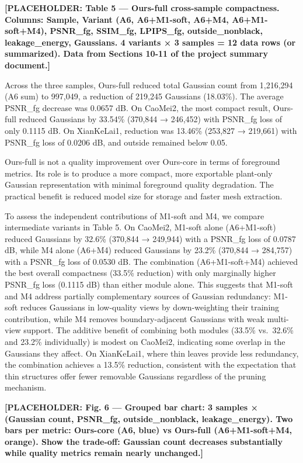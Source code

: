 \documentclass[11pt,a4paper]{article}
\begin{document}
\textbf{{[}PLACEHOLDER: Table 5 --- Ours-full cross-sample compactness.
Columns: Sample, Variant (A6, A6+M1-soft, A6+M4, A6+M1-soft+M4),
PSNR\_fg, SSIM\_fg, LPIPS\_fg, outside\_nonblack, leakage\_energy,
Gaussians. 4 variants × 3 samples = 12 data rows (or summarized). Data
from Sections 10-11 of the project summary document.{]}}

Across the three samples, Ours-full reduced total Gaussian count from
1,216,294 (A6 sum) to 997,049, a reduction of 219,245 Gaussians
(18.03\%). The average PSNR\_fg decrease was 0.0657 dB. On CaoMei2, the
most compact result, Ours-full reduced Gaussians by 33.54\% (370,844 →
246,452) with PSNR\_fg loss of only 0.1115 dB. On XianKeLai1, reduction
was 13.46\% (253,827 → 219,661) with PSNR\_fg loss of 0.0206 dB, and
outside remained below 0.05.

Ours-full is not a quality improvement over Ours-core in terms of
foreground metrics. Its role is to produce a more compact, more
exportable plant-only Gaussian representation with minimal foreground
quality degradation. The practical benefit is reduced model size for
storage and faster mesh extraction.

To assess the independent contributions of M1-soft and M4, we compare
intermediate variants in Table 5. On CaoMei2, M1-soft alone (A6+M1-soft)
reduced Gaussians by 32.6\% (370,844 → 249,944) with a PSNR\_fg loss of
0.0787 dB, while M4 alone (A6+M4) reduced Gaussians by 23.2\% (370,844 →
284,757) with a PSNR\_fg loss of 0.0530 dB. The combination
(A6+M1-soft+M4) achieved the best overall compactness (33.5\% reduction)
with only marginally higher PSNR\_fg loss (0.1115 dB) than either module
alone. This suggests that M1-soft and M4 address partially complementary
sources of Gaussian redundancy: M1-soft reduces Gaussians in low-quality
views by down-weighting their training contribution, while M4 removes
boundary-adjacent Gaussians with weak multi-view support. The additive
benefit of combining both modules (33.5\% vs.~32.6\% and 23.2\%
individually) is modest on CaoMei2, indicating some overlap in the
Gaussians they affect. On XianKeLai1, where thin leaves provide less
redundancy, the combination achieves a 13.5\% reduction, consistent with
the expectation that thin structures offer fewer removable Gaussians
regardless of the pruning mechanism.

\textbf{{[}PLACEHOLDER: Fig. 6 --- Grouped bar chart: 3 samples ×
(Gaussian count, PSNR\_fg, outside\_nonblack, leakage\_energy). Two bars
per metric: Ours-core (A6, blue) vs Ours-full (A6+M1-soft+M4, orange).
Show the trade-off: Gaussian count decreases substantially while quality
metrics remain nearly unchanged.{]}}
\end{document}

